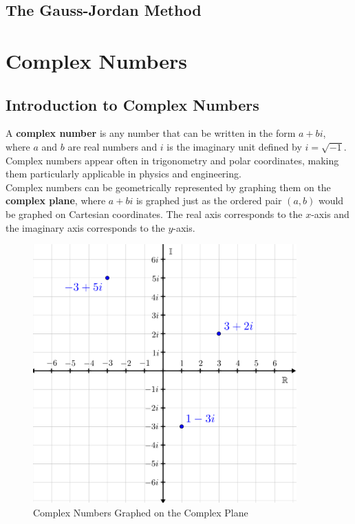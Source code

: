 \documentclass{article}
\begin{document}
    \subsection{The Gauss-Jordan Method}


    \pagebreak

    \section{Complex Numbers}

        \subsection{Introduction to Complex Numbers}
            A \textbf{complex number} is any number that can be written in the form $a+bi$, where
            $a$ and $b$ are real numbers and $i$ is the imaginary unit defined by $i=\sqrt{-1}$.
            Complex numbers appear often in trigonometry and polar coordinates, making them
            particularly applicable in physics and engineering. \\

            \noindent Complex numbers can be geometrically represented by graphing them on the
            \textbf{complex plane}, where $a+bi$ is graphed just as the ordered pair $(a,b)$ would
            be graphed on Cartesian coordinates. The real axis corresponds to the $x$-axis and the
            imaginary axis corresponds to the $y$-axis.\\

            \begin{figure} [hbt!]
                \centering
                \includegraphics[scale=0.75]{Resources/Unit4Complex/complex.PNG}
                \caption*{Complex Numbers Graphed on the Complex Plane}
            \end{figure}
\end{document}
